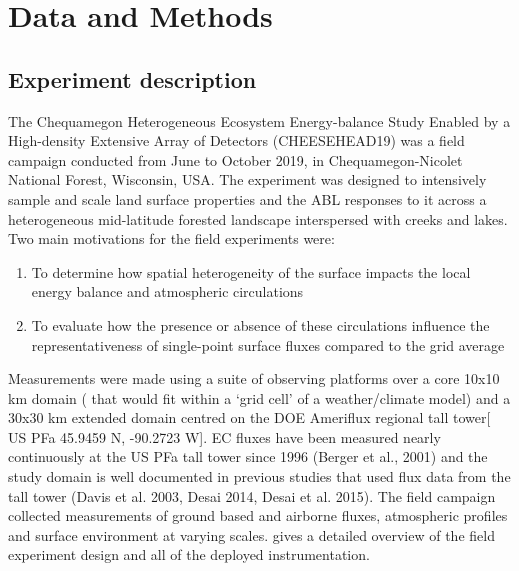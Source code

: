 \documentclass[draft]{agujournal2019}
\begin{document}
%

\section{Data and Methods}

\subsection{ Experiment description}

The Chequamegon Heterogeneous Ecosystem Energy-balance Study Enabled by a High-density Extensive Array of Detectors  (CHEESEHEAD19) was a field campaign conducted from June to October 2019, in Chequamegon-Nicolet National Forest, Wisconsin, USA. The experiment was designed to intensively sample and scale land surface properties and the ABL responses to it across a heterogeneous mid-latitude forested landscape interspersed with creeks and lakes.
Two main motivations for the field experiments were:

\begin{enumerate}
    \item To determine how spatial heterogeneity of the surface impacts the local energy balance and  atmospheric circulations
    \item To evaluate how the presence or absence of these circulations influence the representativeness of single-point surface fluxes compared to the grid average 
\end{enumerate}

Measurements were made using a suite of observing platforms over a core 10x10 km domain ( that would fit within a ‘grid cell’ of a weather/climate model)  and a 30x30 km extended domain centred on the DOE Ameriflux regional tall tower[ US PFa 45.9459 N, -90.2723 W].  EC fluxes have been measured nearly continuously at the US PFa tall tower since 1996 (Berger et al., 2001) and the study domain  is well documented in previous studies that used flux data from the tall tower (Davis et al. 2003, Desai 2014, Desai et al. 2015). The field campaign collected measurements of ground based and airborne fluxes, atmospheric profiles and surface environment at varying scales.  gives a detailed overview of the field experiment design and all of the deployed instrumentation. 
\end{document}
